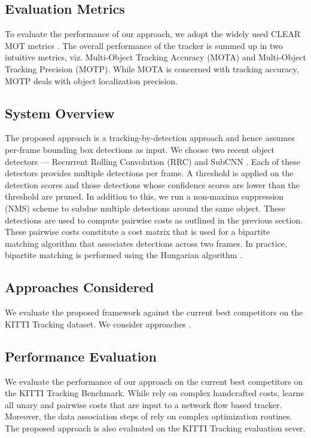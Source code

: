 \documentclass[letterpaper, 10 pt, conference]{ieeeconf}
\begin{document}
\subsection{Evaluation Metrics}
To evaluate the performance of our approach, we adopt the widely used CLEAR MOT metrics \cite{CLEARMOT}. The overall performance of the tracker is summed up in two intuitive metrics, viz. Multi-Object Tracking Accuracy (MOTA) and Multi-Object Tracking Precision (MOTP). While MOTA is concerned with tracking accuracy, MOTP deals with object localization precision.

\subsection{System Overview}
The proposed approach is a tracking-by-detection approach and hence assumes per-frame bounding box detections as input. We choose two recent object detectors --- Recurrent Rolling Convolution (RRC) \cite{RRC} and SubCNN \cite{SubCNN}. Each of these detectors provides multiple detections per frame. A threshold is applied on the detection scores and those detections whose confidence scores are lower than the threshold are pruned. In addition to this, we run a non-maxima suppression (NMS) scheme to subdue multiple detections around the same object. These detections are used to compute pairwise costs as outlined in the previous section. These pairwise costs constitute a cost matrix that is used for a bipartite matching algorithm that associates detections across two frames. In practice, bipartite matching is performed using the  Hungarian algorithm \cite{hungarian}.

\subsection{Approaches Considered}
We evaluate the proposed framework against the current best competitors on the KITTI Tracking dataset. We consider approaches \cite{DeepNetworkFlow,NOMT,CIWT,followme}. 

\subsection{Performance Evaluation}
We evaluate the performance of our approach on the current best competitors on the KITTI Tracking Benchmark. While \cite{NOMT,CIWT,followme} rely on complex handcrafted costs, \cite{DeepNetworkFlow} learns all unary and pairwise costs that are input to a network flow based tracker. Moreover, the data association steps of \cite{NOMT,CIWT,followme} rely on complex optimization routines. The proposed approach is also evaluated on the KITTI Tracking evaluation sever.
\end{document}
